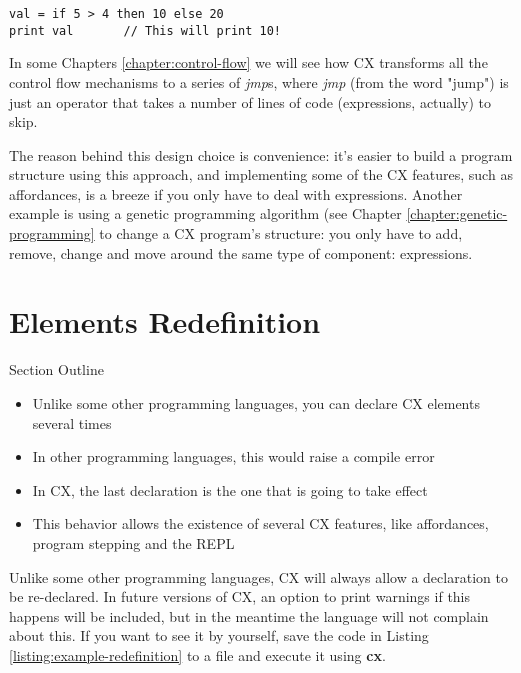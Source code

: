 \documentclass[11pt,fleqn,openany]{book} %
\begin{document}
\begin{lstlisting}[caption={Example of if/else Statement as an Expression},captionpos=b,label={listing:statement-as-expression}]
val = if 5 > 4 then 10 else 20
print val       // This will print 10!
\end{lstlisting}

In some Chapters \ref{chapter:control-flow} we will see how CX transforms all the control flow mechanisms to a series of \textit{jmp}s, where \textit{jmp} (from the word "jump") is just an operator that takes a number of lines of code (expressions, actually) to skip.

The reason behind this design choice is convenience: it's easier to build a program structure using this approach, and implementing some of the CX features, such as affordances, is a breeze if you only have to deal with expressions. Another example is using a genetic programming algorithm (see Chapter \ref{chapter:genetic-programming} to change a CX program's structure: you only have to add, remove, change and move around the same type of component: expressions.

\section{Elements Redefinition}

\begin{remark}
Section Outline
    \begin{itemize}
    	\item Unlike some other programming languages, you can declare CX elements several times
        \item In other programming languages, this would raise a compile error
        \item In CX, the last declaration is the one that is going to take effect
        \item This behavior allows the existence of several CX features, like affordances, program stepping and the REPL
    \end{itemize}
\end{remark}

Unlike some other programming languages, CX will always allow a declaration to be re-declared. In future versions of CX, an option to print warnings if this happens will be included, but in the meantime the language will not complain about this. If you want to see it by yourself, save the code in Listing \ref{listing:example-redefinition} to a file and execute it using \textbf{cx}.
\end{document}
